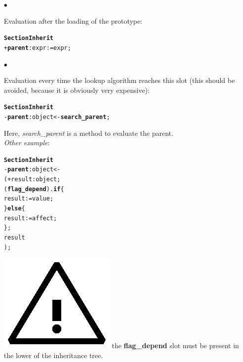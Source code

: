 \documentclass[11pt]{mybook}
\newcommand{\warning}{\includegraphics[scale=0.3]{figures/warning}}
\begin{document}
\begin{itemize}
\item[$\bullet$]{Evaluation after the loading of the
prototype:
\begin{alltt} 
{\bf{}Section Inherit}
  + {\bf{}parent}:{\sc{}expr} := {\sc{}expr};
\end{alltt}}

\item[$\bullet$]{Evaluation every time the lookup algorithm reaches 
this slot (this should be avoided, because it is obviously very expensive):
\begin{alltt} 
{\bf{}Section Inherit}
  - {\bf{}parent}:{\sc{}object} <- {\bf{}search\_parent};
\end{alltt}
Here, {\it{}search\_parent} is a method to evaluate the parent.\\

{\it{}Other example}:
\begin{alltt} 
{\bf{}Section Inherit}
  - {\bf{}parent}:{\sc{}object} <-
  ( + result:{\sc{}object};
    ({\bf{}flag\_depend}).{\bf{}if} \{
      result := {\sc{}value};
    \} {\bf{}else} \{
      result := {\sc{}affect};
    \};
    result
  );
\end{alltt}
\warning{} the {\bf{}flag\_depend} slot must be present in the lower of the inheritance tree.
}\end{itemize}
\end{document}
